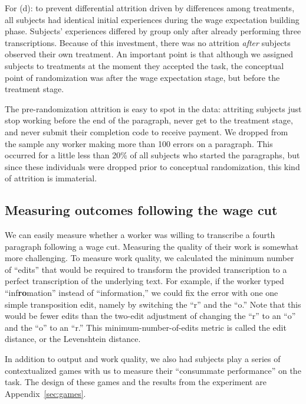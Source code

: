 \documentclass[11pt]{article}
\begin{document}
For (d): to prevent differential attrition driven by differences among treatments, all subjects had identical initial experiences during the wage expectation building phase.
Subjects' experiences differed by group only after already performing three transcriptions.
Because of this investment, there was no attrition \emph{after} subjects observed their own treatment.
An important point is that although we assigned subjects to treatments at the moment they accepted the task, the conceptual point of randomization was after the wage expectation stage, but before the treatment stage.
  
The pre-randomization attrition is easy to spot in the data: attriting subjects just stop working before the end of the paragraph, never get to the treatment stage, and never submit their completion code to receive payment.
We dropped from the sample any worker making more than 100 errors on a paragraph.
This occurred for a little less than 20\% of all subjects who started the paragraphs, but since these individuals were dropped prior to conceptual randomization, this kind of attrition is immaterial.
  
\subsection{Measuring outcomes following the wage cut}
We can easily measure whether a worker was willing to transcribe a fourth paragraph following a wage cut.
Measuring the quality of their work is somewhat more challenging. 
To measure work quality, we calculated the minimum number of ``edits'' that would be required to transform the provided transcription to a perfect transcription of the underlying text.
For example, if the worker typed ``inf{\bf ro}mation'' instead of ``information,'' we could fix the error with one one simple transposition edit, namely by switching the ``r'' and the ``o.''
Note that this would be fewer edits than the two-edit adjustment of changing the ``r'' to an ``o'' and the ``o'' to an ``r.'' 
This minimum-number-of-edits metric is called the edit distance, or the Levenshtein distance.

In addition to output and work quality, we also had subjects play a
series of contextualized games with us to measure their ``consummate
performance'' on the task. The design of these games and the results from the experiment are Appendix~\ref{sec:games}. 
\end{document}
